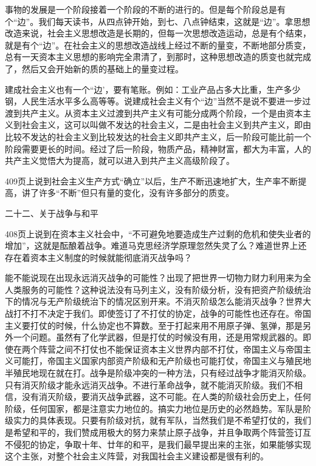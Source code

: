 事物的发展是一个阶段接着一个阶段的不断的进行的。但是每个阶段总是有个“边”。我们每天读书，从四点钟开始，到七、八点钟结束，这就是“边”。拿思想改造来说，社会主义思想改造是长期的，但每一次思想改造运动，总是有个结束，就是有个“边”。在社会主义的思想改造战线上经过不断的量变，不断地部分质变，总有一天资本主义思想的影响完全肃清了，到那时，这种思想改造的质变也就完成了，然后又会开始新的质的基础上的量变过程。

建成社会主义也有一个“边’，要有笔账。例如：工业产品占多大比重，生产多少钢，人民生活水平多么高等等。说建成社会主义有个“边”当然不是说不要进一步过渡到共产主义。从资本主义过渡到共产主义有可能分成两个阶段，一个是由资本主义到社会主义，这可以叫做不发达的社会主义，二是由社会主义到共产主义，即由比较不发达的社会主义到比较发达的社会主义即共产主义，后一阶段可能比前一个阶段需要更长的时间。经过了后一阶段，物质产品，精神财富，都大为丰富，人的共产主义觉悟大为提高，就可以进入到共产主义高级阶段了。

409页上说到社会主义生产方式“确立”以后，生产不断迅速地扩大，生产率不断提高，讲了许多“不断”但只有量的变化，没有许多部分的质变。

二十二、关于战争与和平

408页上说到在资本主义社会中，“不可避免地要造成生产过剩的危机和使失业者的增加”，这就是酝酿着战争。难道马克思经济学原理忽然失灵了么？难道世界上还存在着资本主义制度的时候就能彻底消灭战争吗？

能不能说现在出现永远消灭战争的可能性？出现了把世界一切物力财力利用来为全人类服务的可能性？这种说法没有马列主义，没有阶级分析，没有把资产阶级统治下的情况与无产阶级统治下的情况区别开来。不消灭阶级怎么能消灭战争？世界大战打不打不决定于我们。即使签订了不打仗的协定，战争的可能性也还存在。帝国主义要打仗的时候，什么协定也不算数。至于打起来用不用原子弹、氢弹，那是另外一个问题。虽然有了化学武器，但是打仗的时候没有用，还是用常规武器的。即使在两个阵营之间不打仗也不能保证资本主义世界内部不打仗，帝国主义与帝国主义可能打，帝国主义国家内部资产阶级和无产阶级也可能打仗，帝国主义与殖民地半殖民地现在就在打。战争是阶级冲突的一种方法，只有经过战争才能消灭阶级。只有消灭阶级才能永远消灭战争。不进行革命战争，就不能消灭阶级。我们不相信，没有消灭阶级，要消灭战争武器，这不可能。在人类的阶级社会历史上，任何阶级，任何国家，都是注意实力地位的。搞实力地位是历史的必然趋势。军队是阶级实力的具体表现。只要有阶级对抗，就有军队，当然我们是不希望打仗的，我们是希望和平的，我们赞成用极大的努力来禁止原子战争，并且争取两个阵营签订互不侵犯的协定，争取十年、廿年的和平，是我们最早提出来的主张，如果能够实现这个主张，对整个社会主义阵营，对我国社会主义建设都是很有利的。

